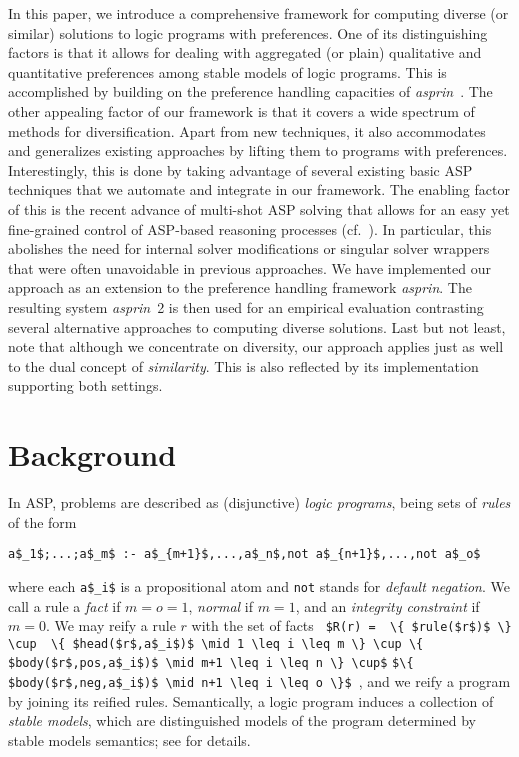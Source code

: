 \documentclass[a4paper,USenglish]{oasics-v2016}
\newcommand{\lm}[1]{\lstinline[mathescape=true]!#1!}
\newcommand{\sysfont}{\textit}
\newcommand{\asprin}{\sysfont{asprin}}
\begin{document}
In this paper,
we introduce a comprehensive framework for computing diverse (or similar) solutions to logic programs with preferences.
One of its distinguishing factors is that it allows for dealing with aggregated (or plain) qualitative and quantitative preferences among stable models of logic programs.
This is accomplished by building on the preference handling capacities of \asprin~\cite{brderosc15a}.
The other appealing factor of our framework is that it covers a wide spectrum of methods for diversification.
Apart from new techniques, it also accommodates and generalizes existing approaches by lifting them to programs with preferences.
Interestingly, this is done by taking advantage of several existing basic ASP techniques that we automate and integrate in our framework.
The enabling factor of this is the recent advance of multi-shot ASP solving that allows for an easy yet fine-grained control of
ASP-based reasoning processes (cf.~\cite{gekakasc14b}).
In particular, this abolishes the need for internal solver modifications or singular solver wrappers that were often unavoidable in previous approaches.
We have implemented our approach as an extension to the preference handling framework \asprin.
The resulting system \asprin~2 is then used for an empirical evaluation contrasting several alternative approaches to
computing diverse solutions.
%
Last but not least,
note that although we concentrate on diversity,
our approach applies just as well to the dual concept of \emph{similarity}.
This is also reflected by its implementation supporting both settings.

\section{Background}\label{sec:background}
 
In ASP, problems are described as (disjunctive) \emph{logic programs}, 
being sets of \emph{rules} of the form
\begin{lstlisting}[mathescape=true,numbers=none]
   a$_1$;...;a$_m$ :- a$_{m+1}$,...,a$_n$,not a$_{n+1}$,...,not a$_o$
\end{lstlisting}
where each \lstinline[mathescape=true]{a$_i$} is a propositional atom %
and
\lstinline[mathescape=true]{not} stands for \emph{default negation}.
%
We call a rule a \emph{fact} if $m=o=1$, 
\emph{normal} if $m=1$, and 
an \emph{integrity constraint} if $m=0$.
%
We may reify a rule $r$ with the set of facts 
\lm{
$R(r) = 
\{ $rule($r$)$ \} \cup 
\{ $head($r$,a$_i$)$ \mid 1 \leq i \leq m \} \cup
\{ $body($r$,pos,a$_i$)$ \mid m+1 \leq i \leq n \} \cup$}
\lm{$\{ $body($r$,neg,a$_i$)$ \mid n+1 \leq i \leq o \}$
}, and we reify 
a program by joining its reified rules.
%
Semantically, a logic program induces a collection of \emph{stable models},
which are distinguished models of the program determined by stable models semantics;
see \cite{gellif91a} for details.
 
\end{document}

